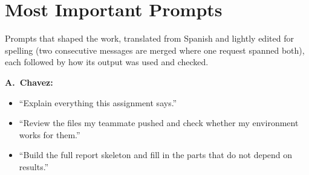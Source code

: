 \documentclass[conference]{IEEEtran}
\begin{document}



\appendices
\section{Most Important Prompts}\label{app:prompts}
Prompts that shaped the work, translated from Spanish and lightly edited for spelling
(two consecutive messages are merged where one request spanned both), each followed by
how its output was used and checked.

\textbf{A.~Chavez:}
\begin{itemize}
  \item ``Explain everything this assignment says.''
  \item ``Review the files my teammate pushed and check whether my environment works for
        them.''
  \item ``Build the full report skeleton and fill in the parts that do not depend on
        results.''
\end{itemize}
\end{document}
